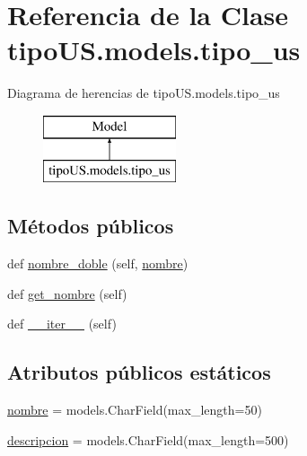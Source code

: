\hypertarget{classtipo_u_s_1_1models_1_1tipo__us}{}\section{Referencia de la Clase tipo\+U\+S.\+models.\+tipo\+\_\+us}
\label{classtipo_u_s_1_1models_1_1tipo__us}
Diagrama de herencias de tipo\+U\+S.\+models.\+tipo\+\_\+us\begin{figure}[H]
\begin{center}
\leavevmode
\includegraphics[height=2.000000cm]{classtipo_u_s_1_1models_1_1tipo__us}
\end{center}
\end{figure}
\subsection*{Métodos públicos}
\begin{DoxyCompactItemize}
\item 
def \hyperlink{classtipo_u_s_1_1models_1_1tipo__us_ac9291e68bc98b2a1109faf59b2e4b4b9}{nombre\+\_\+doble} (self, \hyperlink{classtipo_u_s_1_1models_1_1tipo__us_afc502ae2c26fb38390d35a9cff37e851}{nombre})
\item 
def \hyperlink{classtipo_u_s_1_1models_1_1tipo__us_a3f0c37049813db801fee9c3e0165a4cc}{get\+\_\+nombre} (self)
\item 
def \hyperlink{classtipo_u_s_1_1models_1_1tipo__us_aae01456e11df1ab8da41fa1cf29ed679}{\+\_\+\+\_\+iter\+\_\+\+\_\+} (self)
\end{DoxyCompactItemize}
\subsection*{Atributos públicos estáticos}
\begin{DoxyCompactItemize}
\item 
\hyperlink{classtipo_u_s_1_1models_1_1tipo__us_afc502ae2c26fb38390d35a9cff37e851}{nombre} = models.\+Char\+Field(max\+\_\+length=50)
\item 
\hyperlink{classtipo_u_s_1_1models_1_1tipo__us_a4e556fd56148d0432b0d2db8468008e4}{descripcion} = models.\+Char\+Field(max\+\_\+length=500)
\end{DoxyCompactItemize}


